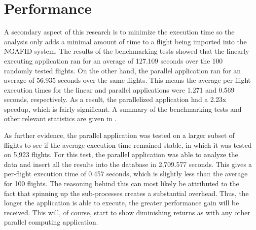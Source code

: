 \section{Performance}

	A secondary aspect of this research is to minimize the execution time so the analysis only adds a minimal amount of time to a flight being imported into the NGAFID system.  The results of the benchmarking tests showed that the linearly executing application ran for an average of 127.109 seconds over the 100 randomly tested flights.  On the other hand, the parallel application ran for an average of 56.935 seconds over the same flights.  This means the average per-flight execution times for the linear and parallel applications were 1.271 and 0.569 seconds, respectively.  As a result, the parallelized application had a 2.23x speedup, which is fairly significant.  A summary of the benchmarking tests and other relevant statistics are given in .
    
    As further evidence, the parallel application was tested on a larger subset of flights to see if the average execution time remained stable, in which it was tested on 5,923 flights.  For this test, the parallel application was able to analyze the data and insert all the results into the database in 2,709.577 seconds.  This gives a per-flight execution time of 0.457 seconds, which is slightly less than the average for 100 flights.  The reasoning behind this can most likely be attributed to the fact that spinning up the sub-processes creates a substantial overhead.  Thus, the longer the application is able to execute, the greater performance gain will be received.  This will, of course, start to show diminishing returns as with any other parallel computing application.
    
